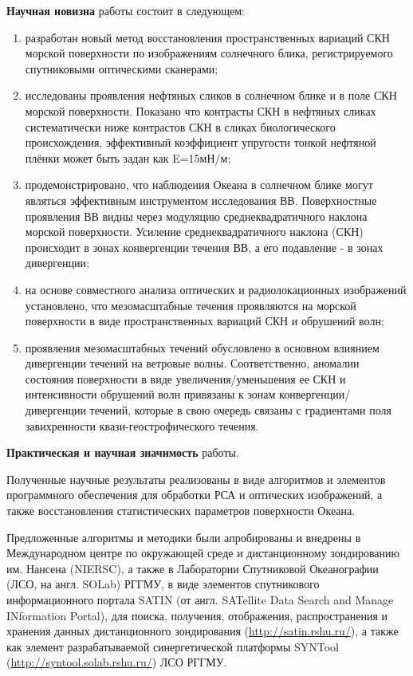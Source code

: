 \textbf{Научная новизна} работы состоит в следующем:

\begin{enumerate}
\item  разработан новый метод восстановления пространственных вариаций СКН морской поверхности по изображениям солнечного блика, регистрируемого спутниковыми оптическими сканерами;

\item  исследованы проявления нефтяных сликов в солнечном блике и в поле СКН морской поверхности. Показано что контрасты СКН в нефтяных сликах систематически ниже контрастов СКН в сликах биологического происхождения, эффективный коэффициент упругости тонкой нефтяной плёнки может быть задан как E=15мН/м;

\item  продемонстрировано, что наблюдения Океана в солнечном блике могут являться эффективным инструментом исследования ВВ. Поверхностные проявления ВВ видны через модуляцию среднеквадратичного наклона морской поверхности. Усиление среднеквадратичного наклона (СКН) происходит в зонах конвергенции течения ВВ, а его подавление - в зонах дивергенции;

\item  на основе совместного анализа оптических и радиолокационных изображений установлено, что мезомасштабные течения проявляются на морской поверхности в виде пространственных вариаций СКН и обрушений волн;

\item  проявления мезомасштабных течений обусловлено в основном влиянием дивергенции течений на ветровые волны. Соответственно, аномалии состояния поверхности в виде увеличения/уменьшения ее СКН и интенсивности обрушений волн привязаны к зонам конвергенции/дивергенции течений, которые в свою очередь связаны с градиентами поля завихренности квази-геострофического течения.
\end{enumerate}

\textbf{Практическая и научная значимость} работы.

Полученные научные результаты реализованы в виде алгоритмов и элементов программного обеспечения для обработки РСА и оптических изображений, а также восстановления статистических параметров поверхности Океана.

Предложенные алгоритмы и методики были апробированы и внедрены в Международном центре по окружающей среде и дистанционному зондированию им. Нансена (NIERSC), а также в Лаборатории Спутниковой Океанографии (ЛСО, на англ. SOLab) РГГМУ, в виде элементов спутникового информационного портала SATIN (от англ. SATellite Data Search and Manage INformation Portal), для поиска, получения, отображения, распространения и хранения данных дистанционного зондирования (\url{http://satin.rshu.ru/}), а также как элемент разрабатываемой синергетической платформы SYNTool (\url{http://syntool.solab.rshu.ru/}) ЛСО РГГМУ.

